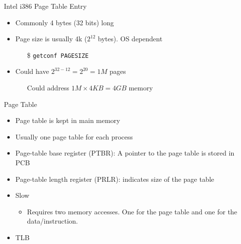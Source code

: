 
\begin{frame}{Intel i386 Page Table Entry}
  \begin{itemize}
  \item Commonly 4 bytes (32 bits) long
  \item Page size is usually 4k ($2^{12}$ bytes). OS dependent
    \begin{itemize}
    \item[\$] \texttt{getconf PAGESIZE}
    \end{itemize}
  \item Could have $2^{32-12}=2^{20}=1M$ pages
    \begin{itemize}
    \item[] Could address $1M\times{}4KB=4GB$ memory
    \end{itemize}
  \end{itemize}
  \centering
\end{frame}

\begin{frame}{Page Table}
  \begin{itemize}
  \item Page table is kept in main memory
  \item Usually one page table for each process
  \item \alert{Page-table base register (PTBR):} A pointer to the page table is stored in
    PCB
  \item \alert{Page-table length register (PRLR):} indicates size of the page table
  \item Slow
    \begin{itemize}
    \item Requires two memory accesses. One for the page table and one for the
      data/instruction.
    \end{itemize}
  \item TLB
  \end{itemize}
\end{frame}

